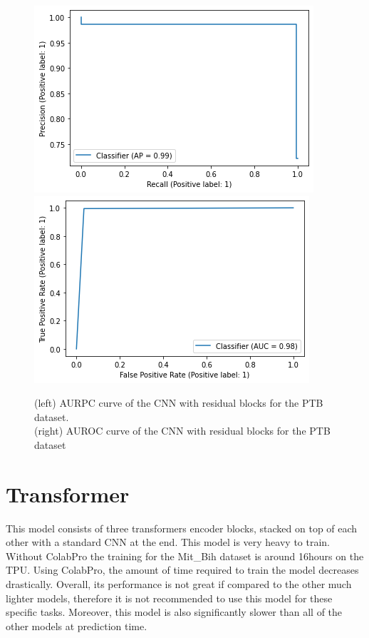 \documentclass[11pt]{scrartcl}
\begin{document}
\begin{figure}[htp]
\centering
\includegraphics[width=.50\textwidth]{../models_performance_graphs/ptb/res_net_ptb_auprc.png}\hfill
\includegraphics[width=.50\textwidth]{../models_performance_graphs/ptb/res_net_ptb_auroc.png}\hfill
\caption{(left) AURPC curve of the CNN with residual blocks for the PTB dataset. \\ (right) AUROC curve of the CNN with residual blocks for the PTB dataset}
\label{fig:res_ptb_two}
\end{figure}




\section{Transformer}
This model consists of three transformers encoder blocks, stacked on top of each other with a standard CNN at the end. This model is very heavy to train. Without ColabPro the training for the Mit\_Bih dataset is around 16hours on the TPU.  Using ColabPro, the amount of time required to train the model decreases drastically. Overall, its performance is not great if compared to the other much lighter models, therefore it is not recommended to use this model for these specific tasks. Moreover, this model is also significantly slower than all of the other models at prediction time.
\end{document}
